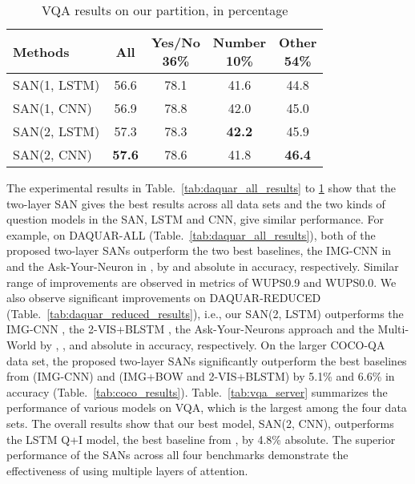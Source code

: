 \documentclass[10pt,twocolumn,letterpaper]{article}
\begin{document}
\begin{table}
  \centering
  \begin{tabular}{l  c c c c}
    \toprule
    Methods & All & \shortstack{Yes/No\\ 36\%} & \shortstack{Number\\ 10\%} &
                                                                              \shortstack{Other\\ 54\%}\\
    \midrule
    SAN(1, LSTM) & 56.6 & 78.1 & 41.6 & 44.8\\
    SAN(1, CNN) & 56.9 & 78.8 & 42.0 & 45.0\\
    SAN(2, LSTM) & 57.3 & 78.3 & {\bf 42.2} & 45.9\\
    SAN(2, CNN)& {\bf 57.6} & 78.6 & 41.8 & {\bf 46.4}\\
    \bottomrule
  \end{tabular}
  \caption{VQA results on our partition, in percentage}
\label{tab:vqa}
\vspace{-0.6cm}
\end{table}




The experimental results in Table.~\ref{tab:daquar_all_results} to
\ref{tab:vqa} show that the two-layer SAN gives the best results across all
data sets and the two kinds of question models in the SAN, LSTM and CNN, give
similar performance. For example, on DAQUAR-ALL
(Table.~\ref{tab:daquar_all_results}), both of the proposed two-layer SANs
outperform the two best baselines, the IMG-CNN in \cite{ma2015learning} and the
Ask-Your-Neuron in \cite{malinowski2015ask}, by  and  absolute in
accuracy, respectively. Similar range of improvements are observed in metrics
of WUPS0.9 and WUPS0.0. We also observe significant improvements on
DAQUAR-REDUCED (Table.~\ref{tab:daquar_reduced_results}), i.e., our SAN(2,
LSTM) outperforms the IMG-CNN \cite{ma2015learning}, the 2-VIS+BLSTM
\cite{ren2015imageqa}, the Ask-Your-Neurons approach \cite{malinowski2015ask}
and the Multi-World \cite{malinowski2014multi} by , , 
and  absolute in accuracy, respectively. On the larger COCO-QA data
set, the proposed two-layer SANs significantly outperform the best baselines
from \cite{ma2015learning} (IMG-CNN) and \cite{ren2015imageqa} (IMG+BOW and
2-VIS+BLSTM) by 5.1\% and 6.6\% in accuracy
(Table.~\ref{tab:coco_results}). Table.~\ref{tab:vqa_server} summarizes the
performance of various models on VQA, which is the largest among the four data
sets. The overall results show that our best model, SAN(2, CNN), outperforms
the LSTM Q+I model, the best baseline from \cite{antol2015vqa}, by 4.8\%
absolute. The superior performance of the SANs across all four benchmarks
demonstrate the effectiveness of using multiple layers of attention.
\end{document}
